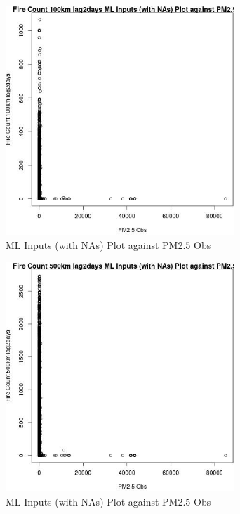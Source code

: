 \begin{figure} 
\centering  
\includegraphics[width=0.77\textwidth]{Code_Outputs/Report_ML_input_PM25_Step4_part_f_de_duplicated_aves_prioritize_24hr_obswNAs_Fire_Count_100km_lag2daysvPM25_Obs.jpg} 
\caption{\label{fig:Report_ML_input_PM25_Step4_part_f_de_duplicated_aves_prioritize_24hr_obswNAsFire_Count_100km_lag2daysvPM25_Obs}ML Inputs (with NAs) Plot against PM2.5 Obs} 
\end{figure} 
 

\begin{figure} 
\centering  
\includegraphics[width=0.77\textwidth]{Code_Outputs/Report_ML_input_PM25_Step4_part_f_de_duplicated_aves_prioritize_24hr_obswNAs_Fire_Count_500km_lag2daysvPM25_Obs.jpg} 
\caption{\label{fig:Report_ML_input_PM25_Step4_part_f_de_duplicated_aves_prioritize_24hr_obswNAsFire_Count_500km_lag2daysvPM25_Obs}ML Inputs (with NAs) Plot against PM2.5 Obs} 
\end{figure} 
 

